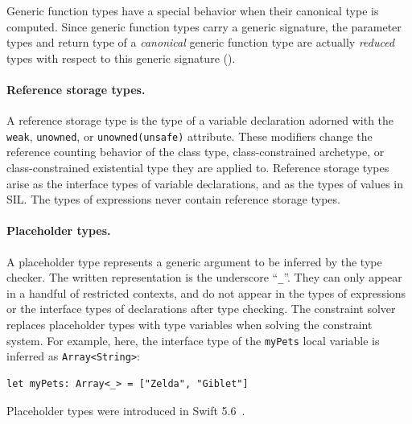 \documentclass[../generics]{subfiles}
\begin{document}
Generic function types have a special behavior when their canonical type is computed. Since generic function types carry a generic signature, the parameter types and return type of a \emph{canonical} generic function type are actually \emph{reduced} types with respect to this generic signature ().

\paragraph{Reference storage types.}
A reference storage type is the type of a variable declaration adorned with the \texttt{weak}, \texttt{unowned}, or \texttt{unowned(unsafe)} attribute. These modifiers change the reference counting behavior of the class type, class-constrained archetype, or class-constrained existential type they are applied to. Reference storage types arise as the interface types of variable declarations, and as the types of values in SIL. The types of expressions never contain reference storage types.

\paragraph{Placeholder types.}
A placeholder type represents a generic argument to be inferred by the type checker. The written representation is the underscore ``\verb|_|''. They can only appear in a handful of restricted contexts, and do not appear in the types of expressions or the interface types of declarations after type checking. The constraint solver replaces placeholder types with type variables when solving the constraint system. For example, here, the interface type of the \texttt{myPets} local variable is inferred as \texttt{Array<String>}:
\begin{Verbatim}
let myPets: Array<_> = ["Zelda", "Giblet"]
\end{Verbatim}
Placeholder types were introduced in Swift 5.6~\cite{se0315}.
\end{document}

